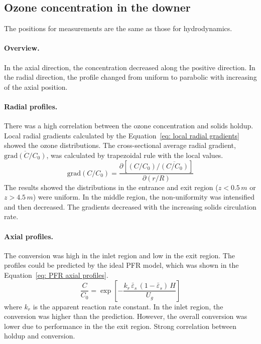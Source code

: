 \subsection{Ozone concentration in the downer}
The positions for measurements are the same as those for hydrodynamics.
\paragraph{Overview. }
In the axial direction, the concentration decreased along the positive direction. 
In the radial direction, the profile changed from uniform to parabolic with increasing of the axial position.

\paragraph{Radial profiles. }
There was a high correlation between the ozone concentration and solids holdup. 
Local radial gradients calculated by the Equation~\eqref{eq: local radial gradients} showed the ozone distributions. 
The cross-sectional average radial gradient, $\overline{\mathrm{grad}(C/C_0)}$, was calculated by trapezoidal rule with the local values.
\begin{equation}
    \mathrm{grad} (C/C_0) 
    = \frac{\partial \left[(C/C_0)/\overline{(C/C_0)} \right]}{\partial (r/R)}
    \label{eq: local radial gradients}
\end{equation}
The results showed the distributions in the entrance and exit region ($z < 0.5\,\si{m}$ or $z > 4.5\,\si{m}$) were uniform. 
In the middle region, the non-uniformity was intensified and then decreased.
The gradients decreased with the increasing solids circulation rate.

\paragraph{Axial profiles. }
The conversion was high in the inlet region and low in the exit region.
The profiles could be predicted by the ideal PFR model, which was shown in the Equation~\eqref{eq: PFR axial profiles}.
\begin{equation}
    \frac{C}{C_0} 
    = \exp\left[ 
        -\frac{k_r\,\bar{\varepsilon}_s\, (1-\bar{\varepsilon}_s)\,H}{U_g} 
        \right]
    \label{eq: PFR axial profiles}
\end{equation}
where $k_r$ is the apparent reaction rate constant. 
In the inlet region, the conversion was higher than the prediction. 
However, the overall conversion was lower due to performance in the the exit region.
Strong correlation between holdup and conversion.

